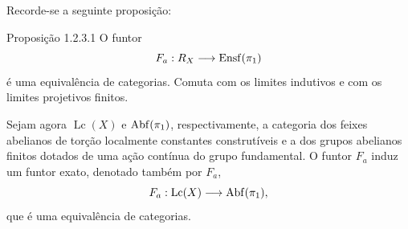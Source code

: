 Recorde-se a seguinte proposição:

\begin{statement}{Proposição 1.2.3.1}
O funtor
\[
F_a:R_X\longrightarrow \operatorname{Ensf}(\pi_1)
\]
é uma equivalência de categorias. Comuta com os limites indutivos e com os limites projetivos finitos.
\end{statement}

Sejam agora \(\operatorname{Lc}(X)\) e \(\operatorname{Abf}(\pi_1)\), respectivamente, a categoria dos feixes abelianos de torção localmente constantes construtíveis e a dos grupos abelianos finitos dotados de uma ação contínua do grupo fundamental. O funtor \(F_a\) induz um funtor exato, denotado também por \(F_a\),
\[
F_a:\operatorname{Lc}(X)\longrightarrow \operatorname{Abf}(\pi_1),
\]
que é uma equivalência de categorias.
